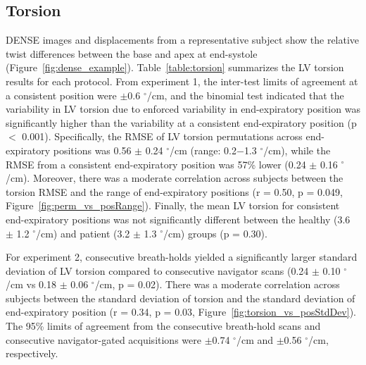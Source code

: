 \subsection{Torsion}
	DENSE images and displacements from a representative subject show the relative twist differences between the base and apex at end-systole (Figure~\ref{fig:dense_example}). Table~\ref{table:torsion} summarizes the LV torsion results for each protocol. From experiment 1, the inter-test limits of agreement at a consistent position were $\pm$0.6 $^{\circ}$/cm, and the binomial test indicated that the variability in LV torsion due to enforced variability in end-expiratory position was significantly higher than the variability at a consistent end-expiratory position (p $<$ 0.001). Specifically, the RMSE of LV torsion permutations across end-expiratory positions was 0.56 $\pm$ 0.24 $^{\circ}$/cm (range: 0.2$-$1.3 $^{\circ}$/cm), while the RMSE from a consistent end-expiratory position was 57\% lower (0.24 $\pm$ 0.16 $^{\circ}$/cm). Moreover, there was a moderate correlation across subjects between the torsion RMSE and the range of end-expiratory positions (r = 0.50, p = 0.049, Figure~\ref{fig:perm_vs_posRange}). Finally, the mean LV torsion for consistent end-expiratory positions was not significantly different between the healthy (3.6 $\pm$ 1.2 $^{\circ}$/cm) and patient (3.2 $\pm$ 1.3 $^{\circ}$/cm) groups (p = 0.30).
	
	For experiment 2, consecutive breath-holds yielded a significantly larger standard deviation of LV torsion compared to consecutive navigator scans (0.24 $\pm$ 0.10 $^{\circ}$/cm vs 0.18 $\pm$ 0.06 $^{\circ}$/cm, p = 0.02). There was a moderate correlation across subjects between the standard deviation of torsion and the standard deviation of end-expiratory position (r = 0.34, p = 0.03, Figure~\ref{fig:torsion_vs_posStdDev}). The 95\% limits of agreement from the consecutive breath-hold scans and consecutive navigator-gated acquisitions were $\pm$0.74 $^{\circ}$/cm and $\pm$0.56 $^{\circ}$/cm, respectively.


